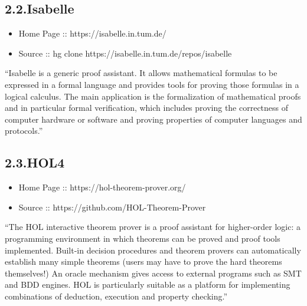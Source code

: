\documentclass[12pt,twoside]{article}
\begin{document}
\subsection{2.2.\hspace*{0.5em}Isabelle}\label{sec-isabelle}%

\begin{itemize}[noitemsep,topsep=\mdcompacttopsep]%

\item{}Home Page :: https://isabelle.in.tum.de/%

\item{}Source :: hg clone https://isabelle.in.tum.de/repos/isabelle%
\end{itemize}%

\noindent{}\textquotedblleft{}Isabelle is a generic proof assistant. It allows mathematical
formulas to be expressed in a formal language and provides tools for
proving those formulas in a logical calculus. The main application is
the formalization of mathematical proofs and in particular formal
verification, which includes proving the correctness of computer
hardware or software and proving properties of computer languages and
protocols.\textquotedblright{}%

\subsection{2.3.\hspace*{0.5em}HOL4}\label{sec-hol4}%

\begin{itemize}[noitemsep,topsep=\mdcompacttopsep]%

\item{}Home Page :: https://hol-theorem-prover.org/%

\item{}Source :: https://github.com/HOL-Theorem-Prover%
\end{itemize}%

\noindent{}\textquotedblleft{}The HOL interactive theorem prover is a proof assistant for
higher-order logic: a programming environment in which theorems can be
proved and proof tools implemented. Built-in decision procedures and
theorem provers can automatically establish many simple theorems
(users may have to prove the hard theorems themselves!) An oracle
mechanism gives access to external programs such as SMT and BDD
engines. HOL is particularly suitable as a platform for implementing
combinations of deduction, execution and property checking.\textquotedblright{}%
\end{document}
